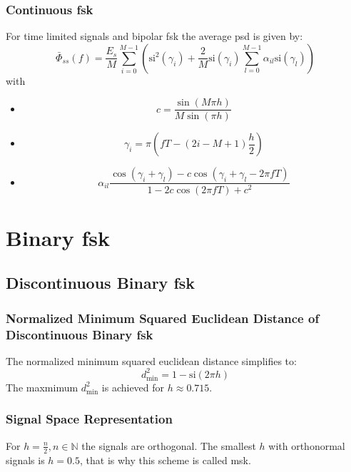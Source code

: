 \subsubsection{Continuous \acl{fsk}}
For time limited signals and bipolar \ac{fsk} the average \ac{psd} is given by:
\begin{equation}
    \bar{\Phi}_{ss}(f) = \frac{E_s}{M} \sum_{i=0}^{M-1} \left(
        \text{si}^2 (\gamma_i) + \frac{2}{M} \text{si}(\gamma_i) \sum_{l=0}^{M-1}
        \alpha_{il} \text{si}(\gamma_l)\right)
\end{equation}
with
\begin{itemize}
    \item 
        \begin{equation}
            c = \frac{\sin(M \pi h)}{M \sin(\pi h)}
        \end{equation}
    \item
        \begin{equation}
            \gamma_i = \pi \left(fT - (2i - M + 1) \frac{h}{2}\right)
        \end{equation}
    \item
        \begin{equation}
            \alpha_{il} \frac{\cos(\gamma_i + \gamma_l) -c \cos(\gamma_i + \gamma_l 
                -2 \pi f T)}{1 - 2 c \cos(2\pi f T) + c^2}
        \end{equation}
\end{itemize}

\section{Binary \acl{fsk}}
\subsection{Discontinuous Binary \acl{fsk}}
\subsubsection{Normalized Minimum Squared Euclidean Distance of Discontinuous 
    Binary \acl{fsk}}
The normalized minimum squared euclidean distance simplifies to:
\begin{equation}
    d_\text{min}^2 = 1- \text{si}(2 \pi h)
\end{equation}
The maxmimum $d_\text{min}^2$ is achieved for $h \approx 0.715$.

\subsubsection{Signal Space Representation}
For $h = \frac{n}{2}, n \in \mathbb{N}$ the signals are orthogonal. The smallest $h$
with orthonormal signals is $h = 0.5$, that is why this scheme is called \ac{msk}.

